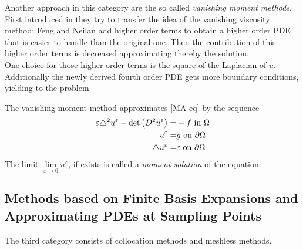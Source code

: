 Another approach in this category are the so called \emph{vanishing moment methods}. First introduced in \cite{FN2009} they try to transfer the idea of the vanishing viscosity method: Feng and Neilan add higher order terms to obtain a higher order PDE that is easier to handle than the original one. Then the contribution of this higher order terms is decreased approximating thereby the \MA solution. \\
One choice for those higher order terms is the square of the Laplacian of $u$. Additionally the newly derived fourth order PDE gets more boundary conditions, yielding to the problem
\begin{definition}
	The vanishing moment method approximates \eqref{MA eq} by the sequence
	\begin{align}
		\varepsilon \triangle^2 u^\varepsilon - \det{\left(D^2 u^\varepsilon\right)} =& -f \text{ in } \Omega \\ 
		u^\varepsilon =& g \text{ on } \partial \Omega\\
		\triangle u^\varepsilon = & \varepsilon \text{ on } \partial \Omega
	\end{align}
The limit $\lim\limits_{\varepsilon \rightarrow 0 } u^\varepsilon$, if exists is called a \emph{moment solution} of the \MA equation.
\end{definition}


\subsection{Methods based on Finite Basis Expansions and Approximating PDEs at Sampling Points}
The third category consists of collocation methods and meshless methods.

